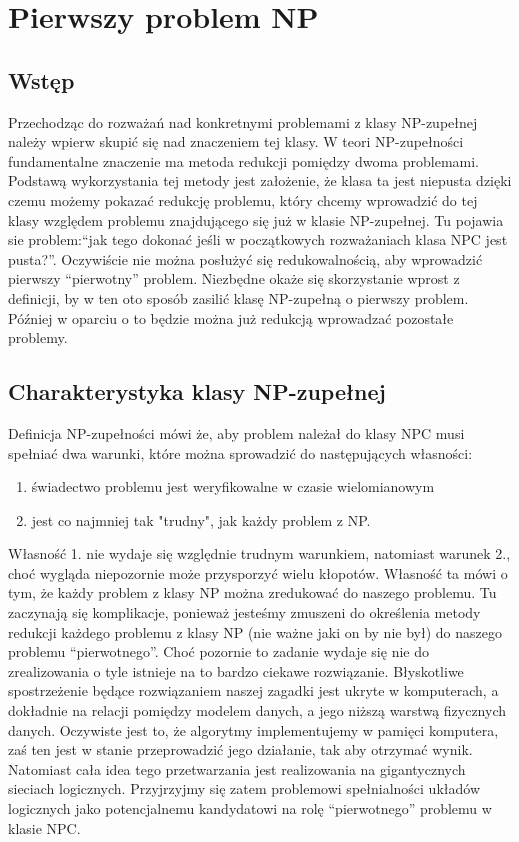 \long{}
\chapter{Pierwszy problem NP}

\section{Wstęp}

Przechodząc do rozważań nad konkretnymi problemami z klasy NP-zupełnej należy wpierw skupić się nad znaczeniem tej klasy. W teori NP-zupełności fundamentalne znaczenie ma metoda redukcji pomiędzy dwoma problemami. Podstawą wykorzystania tej metody jest założenie, że klasa ta jest niepusta dzięki czemu możemy pokazać redukcję problemu, który chcemy wprowadzić do tej klasy względem problemu znajdującego się już w klasie NP-zupełnej. Tu pojawia sie problem:“jak tego dokonać jeśli w początkowych rozważaniach klasa NPC jest pusta?”. Oczywiście nie można posłużyć się redukowalnością, aby wprowadzić pierwszy “pierwotny” problem. Niezbędne okaże się skorzystanie wprost z definicji, by w ten oto sposób zasilić klasę NP-zupełną o pierwszy problem. Później w oparciu o to będzie można już redukcją wprowadzać pozostałe problemy.

\section{Charakterystyka klasy NP-zupełnej}

Definicja NP-zupełności mówi że, aby problem należał do klasy NPC musi spełniać dwa warunki, które można sprowadzić do następujących własności:
\begin{enumerate}
\item świadectwo problemu jest weryfikowalne w czasie wielomianowym
\item jest co najmniej tak "trudny", jak każdy problem z NP.
\end{enumerate}

Własność 1. nie wydaje się względnie trudnym warunkiem, natomiast warunek 2., choć wygląda niepozornie może przysporzyć wielu kłopotów. Własność ta mówi o tym, że każdy problem z klasy NP można zredukować do naszego problemu. Tu zaczynają się komplikacje, ponieważ jesteśmy zmuszeni do określenia metody redukcji każdego problemu z klasy NP (nie ważne jaki on by nie był) do naszego problemu “pierwotnego”. Choć pozornie to zadanie wydaje się nie do zrealizowania o tyle istnieje na to bardzo ciekawe rozwiązanie. Błyskotliwe spostrzeżenie będące rozwiązaniem naszej zagadki jest ukryte w komputerach, a dokładnie na relacji pomiędzy modelem danych, a jego niższą warstwą fizycznych danych. Oczywiste jest to, że algorytmy implementujemy w pamięci komputera, zaś ten jest w stanie przeprowadzić jego działanie, tak aby otrzymać wynik. Natomiast cała idea tego przetwarzania jest realizowania na gigantycznych sieciach logicznych. Przyjrzyjmy się zatem problemowi spełnialności układów logicznych jako potencjalnemu kandydatowi na rolę “pierwotnego” problemu w klasie NPC.

